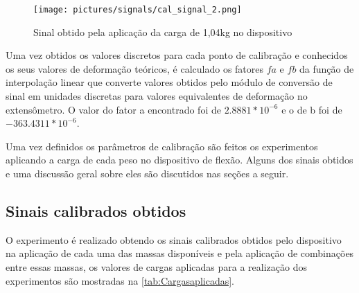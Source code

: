 \begin{figure}[H]
	\caption{\label{fig:420} Sinal obtido pela aplicação da carga de 1,04kg no dispositivo}
	\begin{center}
		\texttt{[image: pictures/signals/cal\_signal\_2.png]}
	\end{center}
\end{figure}

Uma vez obtidos os valores discretos para cada ponto de calibração e conhecidos os seus valores de deformação teóricos, é calculado os fatores $ fa $ e $ fb $ da função de interpolação
linear que converte valores obtidos pelo módulo de conversão de sinal em unidades discretas para valores equivalentes de deformação no extensômetro.
O valor do fator a encontrado foi de $ 2.8881*10^{-6} $ e o de b foi de $ -363.4311*10^{-6} $.

Uma vez definidos os parâmetros de calibração são feitos os experimentos aplicando a carga de cada peso no dispositivo de flexão.
Alguns dos sinais obtidos e uma discussão geral sobre eles são discutidos nas seções a seguir.

\subsection{Sinais calibrados obtidos}

O experimento é realizado obtendo os sinais calibrados obtidos pelo dispositivo na aplicação de cada uma das massas disponíveis e pela aplicação de combinações entre essas massas,
os valores de cargas aplicadas para a realização dos experimentos são mostradas na \autoref{tab:Cargasaplicadas}.

\begin{table}[H]
    \caption{Cargas aplicadas para os experimentos}
    \label{tab:Cargasaplicadas}
    \centering
\end{table}

